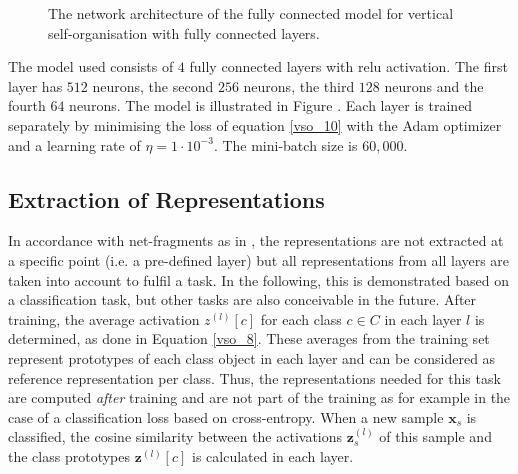 \begin{figure}[h]
{
}
    \caption[Architecture of the fully connected model with vertical self-organisation]{The network architecture of the fully connected model for vertical self-organisation with fully connected layers.}
\end{figure}


The model used consists of $4$ fully connected layers with relu activation. The first layer has $512$ neurons, the second $256$ neurons, the third $128$ neurons and the fourth $64$ neurons. The model is illustrated in Figure . Each layer is trained separately by minimising the loss of equation \eqref{vso_10} with the Adam optimizer and a learning rate of $\eta = 1 \cdot 10^{-3}$. The mini-batch size is $60,000$. 

\subsection{Extraction of Representations}
In accordance with net-fragments as in , the representations are not extracted at a specific point (i.e. a pre-defined layer) but all representations from all layers are taken into account to fulfil a task.
In the following, this is demonstrated based on a classification task, but other tasks are also conceivable in the future.
After training, the average activation $z^{(l)}[c]$ for each class $c \in C$ in each layer $l$ is determined, as done in Equation \eqref{vso_8}.
These averages from the training set represent prototypes of each class object in each layer and can be considered as reference representation per class. Thus, the representations needed for this task are computed \emph{after} training and are not part of the training as for example in the case of a classification loss based on cross-entropy.
When a new sample $\boldsymbol{x}_s$ is classified, the cosine similarity between the activations $\boldsymbol{z}^{(l)}_s$ of this sample and the class prototypes $\boldsymbol{z}^{(l)}[c]$ is calculated in each layer.

